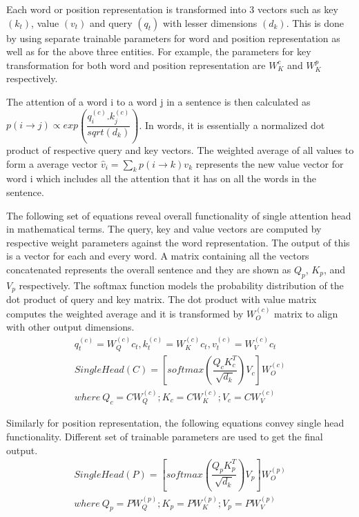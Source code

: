 \documentclass[a4paper, 11pt]{article}
\begin{document}
Each word or position representation is transformed into 3 vectors such as key $(k_t)$,  value $(v_t)$ and query $(q_t)$ with lesser dimensions $(d_k)$. This is done by using separate trainable parameters for word and position representation as well as for the above three entities. For example, the parameters for key transformation for both word and position representation are $W^{c}_K$ and $W^{p}_K$ respectively.

The attention of a word i to a word j in a sentence is then calculated as 
$ p(i\rightarrow{}j) \propto exp(\dfrac{q^{(c)}_i.k^{(c)}_j}{sqrt(d_k)}) $. In words, it is essentially a normalized dot product of respective query and key vectors. The weighted average of all values to form a average vector $\hat{v}_i = \sum_k p(i\rightarrow{}k)v_k$ represents the new value vector for word i which includes all the attention that it has on all the words in the sentence. 

The following set of equations reveal overall functionality of single attention head in mathematical terms. The query, key and value vectors are computed by respective weight parameters against the word representation. The output of this is a vector for each and every word. A matrix containing all the vectors concatenated represents the overall sentence and they are shown as $Q_p$, $K_p$, and $V_p$ respectively. The softmax function models the probability distribution of the dot product of query and key matrix. The dot product with value matrix computes the weighted average and it is transformed by $W^{(c)}_O$ matrix to align with other output dimensions.
\begin{align*}
q^{(c)}_t = W^{(c)}_Q c_t, k^{(c)}_t = W^{(c)}_K c_t, v^{(c)}_t = W^{(c)}_V c_t \\
SingleHead(C) = \left[softmax\left(\dfrac{Q_cK^T_c}{\sqrt{d_k}}\right) V_c\right] W^{(c)}_O \\
where\ Q_c = C{}W^{(c)}_Q; K_c = C{}W^{(c)}_K; V_c = C{}W^{(c)}_V  
\end{align*}

Similarly for position representation, the following equations convey single head functionality. Different set of trainable parameters are used to get the final output.
\begin{align*}
SingleHead(P) = \left[softmax\left(\dfrac{Q_pK^T_p}{\sqrt{d_k}}\right) V_p\right] W^{(p)}_O \\
where\ Q_p = P{}W^{(p)}_Q; K_p = P{}W^{(p)}_K; V_p = P{}W^{(p)}_V
\end{align*}
\end{document}
